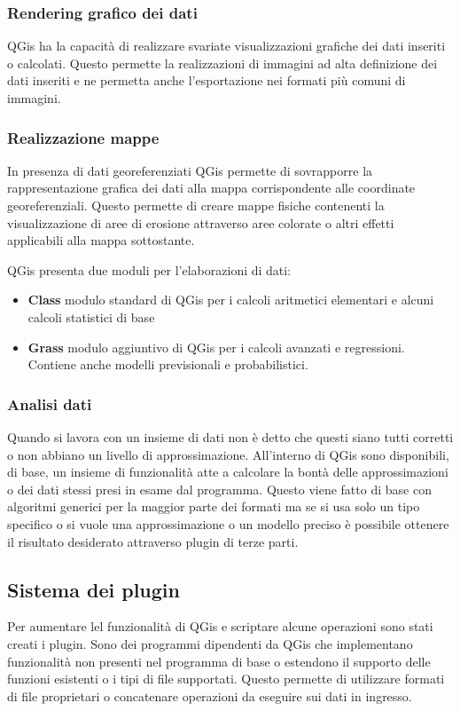 \subsubsection{Rendering grafico dei dati}
QGis ha la capacità di realizzare svariate visualizzazioni grafiche dei dati inseriti o calcolati.
Questo permette la realizzazioni di immagini ad alta definizione dei dati inseriti e ne permetta anche l'esportazione nei formati più comuni di immagini.

\subsubsection{Realizzazione mappe}
In presenza di dati georeferenziati QGis permette di sovrapporre la rappresentazione grafica dei dati alla mappa corrispondente alle coordinate georeferenziali.
Questo permette di creare mappe fisiche contenenti la visualizzazione di aree di erosione attraverso aree colorate o altri effetti applicabili alla mappa sottostante.

QGis presenta due moduli per l'elaborazioni di dati:
\begin{itemize}
	\item \textbf{Class} modulo standard di QGis per i calcoli aritmetici elementari e alcuni calcoli statistici di base
	\item \textbf{Grass} modulo aggiuntivo di QGis per i calcoli avanzati e regressioni. Contiene anche modelli previsionali e probabilistici.
\end{itemize}

\subsubsection{Analisi dati}
Quando si lavora con un insieme di dati non è detto che questi siano tutti corretti o non abbiano un livello di approssimazione.
All'interno di QGis sono disponibili, di base, un insieme di funzionalità atte a calcolare la bontà delle approssimazioni o dei dati stessi presi in esame dal programma.
Questo viene fatto di base con algoritmi generici per la maggior parte dei formati ma se si usa solo un tipo specifico o si vuole una approssimazione o un modello preciso è possibile ottenere il risultato desiderato attraverso plugin di terze parti.

\subsection{Sistema dei plugin}
Per aumentare lel funzionalità di QGis e scriptare alcune operazioni sono stati creati i plugin.
Sono dei programmi dipendenti da QGis che implementano funzionalità non presenti nel programma di base o estendono il supporto delle funzioni esistenti o i tipi di file supportati. Questo permette di utilizzare formati di file proprietari o concatenare operazioni da eseguire sui dati in ingresso.

